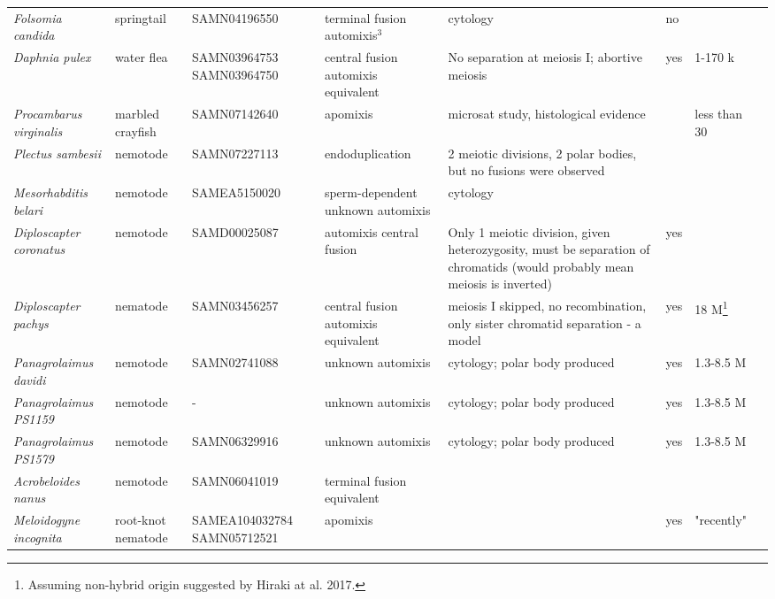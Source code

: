 \documentclass{article}
\begin{document}
\begin{longtable}[H]{ C{.13\textwidth} C{.1\textwidth} C{.12\textwidth} L{.15\textwidth} L{.179\textwidth} C{.04\textwidth} C{.082\textwidth} C{.062\textwidth}}
      \textit{Folsomia candida} & springtail & SAMN04196550 & terminal fusion automixis$^3$ & cytology & no & & \cite{Riparbelli2006} \\
      \textit{Daphnia pulex} & water flea & SAMN03964753 SAMN03964750 & central fusion automixis equivalent & No separation at meiosis I; abortive meiosis & yes & 1-170 k & \cite{Hiruta2010} \\
      \textit{Procambarus virginalis} & marbled crayfish & SAMN07142640 & apomixis & microsat study, histological evidence &  & less than 30 & \cite{Vogt2004,Martin2015,Vogt2015} \\
      \hline
      \textit{Plectus sambesii} & nemotode & SAMN07227113 & endoduplication & 2 meiotic divisions, 2 polar bodies, but no fusions were observed &  & & \cite{Lahl2006} \\
      \textit{Mesorhabditis belari} & nemotode & SAMEA5150020 & sperm-dependent unknown automixis & cytology &  &  & \cite{Grosmaire2019} \\
      \textit{Diploscapter coronatus} & nemotode & SAMD00025087 & automixis central fusion & Only 1 meiotic division, given heterozygosity, must be separation of chromatids (would probably mean meiosis is inverted) & yes & & \cite{Lahl2006,Hiraki2017} \\
      \textit{Diploscapter pachys} & nematode & SAMN03456257 & central fusion automixis equivalent & meiosis I skipped, no recombination, only sister chromatid separation - a model & yes & 18 M\footnote{Assuming non-hybrid origin suggested by Hiraki at al. 2017.} & \cite{Fradin2017} \\
      \textit{Panagrolaimus davidi} & nemotode & SAMN02741088 & unknown automixis & cytology; polar body produced & yes & 1.3-8.5 M & \cite{Schiffer2017} \\
      \textit{Panagrolaimus PS1159} & nemotode & - & unknown automixis & cytology; polar body produced & yes & 1.3-8.5 M & \cite{Schiffer2017} \\
      \textit{Panagrolaimus PS1579} & nemotode & SAMN06329916 & unknown automixis & cytology; polar body produced & yes & 1.3-8.5 M & \cite{Schiffer2017} \\
      \textit{Acrobeloides nanus} & nemotode & SAMN06041019 & terminal fusion equivalent & & & & \cite{Lahl2006} \\
      \textit{Meloidogyne incognita} & root-knot nematode & SAMEA104032784 SAMN05712521 & apomixis & & yes & "recently" & \cite{Triantaphyllou1981, VanderBeek1998, Lunt2014} \\

\end{longtable}
\end{document}
